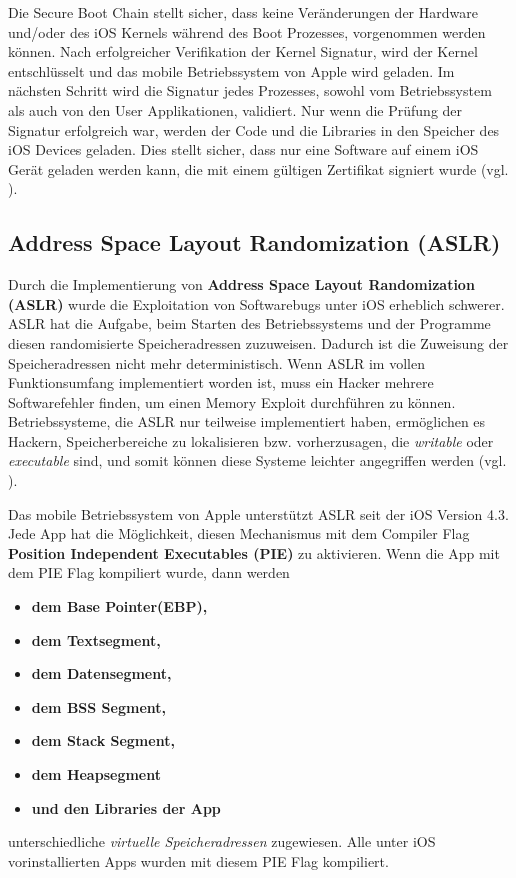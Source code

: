 Die Secure Boot Chain stellt sicher, dass keine Veränderungen der Hardware und/oder des iOS Kernels während des Boot Prozesses, vorgenommen werden können. Nach erfolgreicher Verifikation der Kernel Signatur, wird der Kernel entschlüsselt und das mobile Betriebssystem von Apple wird geladen. Im nächsten Schritt wird die Signatur jedes Prozesses, sowohl vom Betriebssystem als auch von den User Applikationen, validiert. Nur wenn die Prüfung der Signatur erfolgreich war, werden der Code und die Libraries in den Speicher des iOS Devices geladen. Dies stellt sicher, dass nur eine Software auf einem iOS Gerät geladen werden kann, die mit einem gültigen Zertifikat signiert wurde (vgl. \cite{Apple[4], Apple[5], Apple[6]}).

\subsection{Address Space Layout Randomization (ASLR)}
\label{sec:ASLR}

Durch die Implementierung von \textbf{Address Space Layout Randomization (ASLR)} wurde die Exploitation von Softwarebugs unter iOS erheblich schwerer. ASLR hat die Aufgabe, beim Starten des Betriebssystems und der Programme diesen randomisierte Speicheradressen zuzuweisen. Dadurch ist die Zuweisung der Speicheradressen nicht mehr deterministisch. Wenn ASLR im vollen Funktionsumfang implementiert worden ist, muss ein Hacker mehrere Softwarefehler finden, um einen Memory Exploit durchführen zu können. Betriebssysteme, die ASLR nur teilweise implementiert haben, ermöglichen es Hackern, Speicherbereiche zu lokalisieren bzw. vorherzusagen, die \textit{\glqq writable\grqq{}} oder \textit{\glqq executable\grqq{}} sind, und somit können diese Systeme leichter angegriffen werden (vgl. \cite{Apple[4], ASLR[1], ASLR[2], ASLR[3], ASLR[4]}).\par

Das mobile Betriebssystem von Apple unterstützt ASLR seit der iOS Version 4.3. Jede App hat die Möglichkeit, diesen Mechanismus mit dem Compiler Flag \textbf{Position Independent Executables (PIE)} zu aktivieren. Wenn die App mit dem PIE Flag kompiliert wurde, dann werden
\begin{itemize}
    \item \textbf{dem Base Pointer(EBP),}
    \item \textbf{dem Textsegment,} 
    \item \textbf{dem Datensegment,}
    \item \textbf{dem BSS Segment,} 
    \item \textbf{dem Stack Segment,}
    \item \textbf{dem Heapsegment}
    \item \textbf{und den Libraries der App}
\end{itemize}
unterschiedliche \textit{\glqq virtuelle Speicheradressen\grqq{}} zugewiesen. Alle unter iOS vorinstallierten Apps wurden mit diesem PIE Flag kompiliert. 

